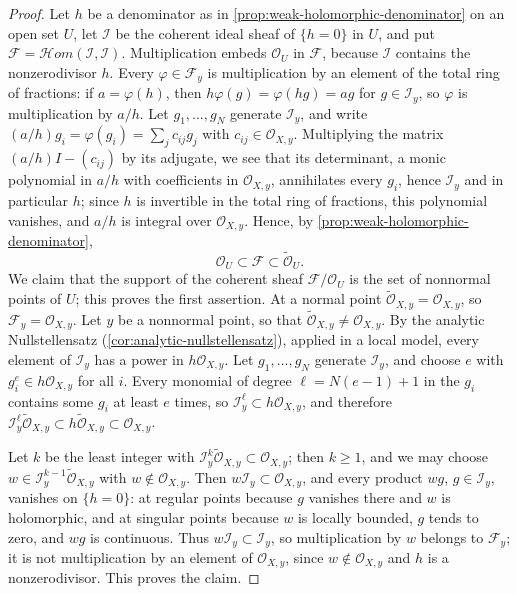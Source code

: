 \begin{proof}
Let $h$ be a denominator as in \cref{prop:weak-holomorphic-denominator} on an open set $U$, let $\mathcal I$ be the coherent ideal sheaf of $\{h=0\}$ in $U$, and put $\mathcal F=\mathcal Hom(\mathcal I,\mathcal I)$. Multiplication embeds $\mathcal O_U$ in $\mathcal F$, because $\mathcal I$ contains the nonzerodivisor $h$. Every $\varphi\in\mathcal F_y$ is multiplication by an element of the total ring of fractions: if $a=\varphi(h)$, then $h\varphi(g)=\varphi(hg)=ag$ for $g\in\mathcal I_y$, so $\varphi$ is multiplication by $a/h$. Let $g_1,\ldots,g_N$ generate $\mathcal I_y$, and write $(a/h)g_i=\varphi(g_i)=\sum_jc_{ij}g_j$ with $c_{ij}\in\mathcal O_{X,y}$. Multiplying the matrix $(a/h)I-(c_{ij})$ by its adjugate, we see that its determinant, a monic polynomial in $a/h$ with coefficients in $\mathcal O_{X,y}$, annihilates every $g_i$, hence $\mathcal I_y$ and in particular $h$; since $h$ is invertible in the total ring of fractions, this polynomial vanishes, and $a/h$ is integral over $\mathcal O_{X,y}$. Hence, by \cref{prop:weak-holomorphic-denominator},
\[
 \mathcal O_U\subset\mathcal F\subset\widetilde{\mathcal O}_U.
\]
We claim that the support of the coherent sheaf $\mathcal F/\mathcal O_U$ is the set of nonnormal points of $U$; this proves the first assertion. At a normal point $\widetilde{\mathcal O}_{X,y}=\mathcal O_{X,y}$, so $\mathcal F_y=\mathcal O_{X,y}$. Let $y$ be a nonnormal point, so that $\widetilde{\mathcal O}_{X,y}\neq\mathcal O_{X,y}$. By the analytic Nullstellensatz (\cref{cor:analytic-nullstellensatz}), applied in a local model, every element of $\mathcal I_y$ has a power in $h\mathcal O_{X,y}$. Let $g_1,\ldots,g_N$ generate $\mathcal I_y$, and choose $e$ with $g_i^e\in h\mathcal O_{X,y}$ for all $i$. Every monomial of degree $\ell=N(e-1)+1$ in the $g_i$ contains some $g_i$ at least $e$ times, so $\mathcal I_y^\ell\subset h\mathcal O_{X,y}$, and therefore $\mathcal I_y^\ell\widetilde{\mathcal O}_{X,y}\subset h\widetilde{\mathcal O}_{X,y}\subset\mathcal O_{X,y}$.

Let $k$ be the least integer with $\mathcal I_y^k\widetilde{\mathcal O}_{X,y}\subset\mathcal O_{X,y}$; then $k\geq1$, and we may choose $w\in\mathcal I_y^{k-1}\widetilde{\mathcal O}_{X,y}$ with $w\notin\mathcal O_{X,y}$. Then $w\mathcal I_y\subset\mathcal O_{X,y}$, and every product $wg$, $g\in\mathcal I_y$, vanishes on $\{h=0\}$: at regular points because $g$ vanishes there and $w$ is holomorphic, and at singular points because $w$ is locally bounded, $g$ tends to zero, and $wg$ is continuous. Thus $w\mathcal I_y\subset\mathcal I_y$, so multiplication by $w$ belongs to $\mathcal F_y$; it is not multiplication by an element of $\mathcal O_{X,y}$, since $w\notin\mathcal O_{X,y}$ and $h$ is a nonzerodivisor. This proves the claim.


\end{proof}
